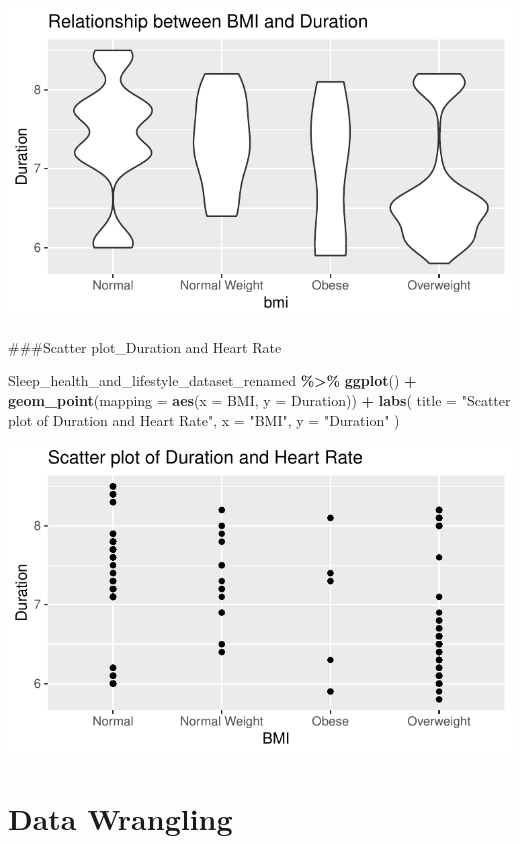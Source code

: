 \documentclass[
  11pt,
]{article}
\newenvironment{Shaded}{\begin{snugshade}}{\end{snugshade}}
\newcommand{\AttributeTok}[1]{\textcolor[rgb]{0.13,0.29,0.53}{#1}}
\newcommand{\FunctionTok}[1]{\textcolor[rgb]{0.13,0.29,0.53}{\textbf{#1}}}
\newcommand{\NormalTok}[1]{#1}
\newcommand{\SpecialCharTok}[1]{\textcolor[rgb]{0.81,0.36,0.00}{\textbf{#1}}}
\newcommand{\StringTok}[1]{\textcolor[rgb]{0.31,0.60,0.02}{#1}}
\begin{document}
\begin{center}\includegraphics[width=0.7\linewidth]{SleepHelath_files/figure-latex/unnamed-chunk-12-1} \end{center}

\#\#\#Scatter plot\_Duration and Heart Rate

\begin{Shaded}
\begin{Highlighting}[]
\NormalTok{Sleep\_health\_and\_lifestyle\_dataset\_renamed    }\SpecialCharTok{\%\textgreater{}\%} 
\FunctionTok{ggplot}\NormalTok{()    }\SpecialCharTok{+}
\FunctionTok{geom\_point}\NormalTok{(}\AttributeTok{mapping =} \FunctionTok{aes}\NormalTok{(}\AttributeTok{x =}\NormalTok{ BMI, }\AttributeTok{y =}\NormalTok{ Duration))    }\SpecialCharTok{+} 
\FunctionTok{labs}\NormalTok{(}
\AttributeTok{title =} \StringTok{"Scatter plot of Duration and Heart Rate"}\NormalTok{, }
\AttributeTok{x =} \StringTok{"BMI"}\NormalTok{,}
\AttributeTok{y =} \StringTok{"Duration"} 
\NormalTok{)}
\end{Highlighting}
\end{Shaded}

\begin{center}\includegraphics[width=0.7\linewidth]{SleepHelath_files/figure-latex/unnamed-chunk-13-1} \end{center}

\hypertarget{data-wrangling}{%
\section{Data Wrangling}\label{data-wrangling}}
\end{document}

